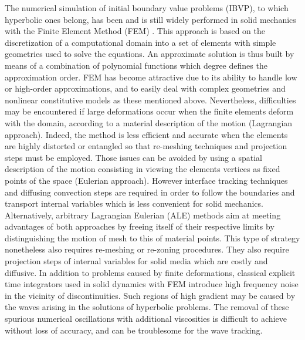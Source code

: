 The numerical simulation of initial boundary value problems (IBVP), to which hyperbolic ones belong, has been and is still widely performed in solid mechanics with the Finite Element Method (FEM) \cite{Belytschko}.
This approach is based on the discretization of a computational domain into a set of elements with simple geometries used to solve the equations.
An approximate solution is thus built by means of a combination of polynomial functions which degree defines the approximation order.
FEM has become attractive due to its ability to handle low or high-order approximations, and to easily deal with complex geometries and nonlinear constitutive models as these mentioned above.  %
Nevertheless, difficulties may be encountered if large deformations occur when the finite elements deform with the domain, according to a material description of the motion (Lagrangian approach).
Indeed, the method is less efficient and accurate when the elements are highly distorted or entangled so that re-meshing techniques and projection steps must be employed.
Those issues can be avoided by using a spatial description of the motion consisting in viewing the elements vertices as fixed points of the space (Eulerian approach).
However interface tracking techniques and diffusing convection steps are required in order to follow the boundaries and transport internal variables which is less convenient for solid mechanics.
Alternatively, arbitrary Lagrangian Eulerian (ALE) methods aim at meeting advantages of both approaches by freeing itself of their respective limits by distinguishing the motion of mesh to this of material points.
This type of strategy nonetheless also requires re-meshing or re-zoning procedures. %
They also require projection steps of internal variables for solid media which are costly and diffusive.
In addition to problems caused by finite deformations, classical explicit time integrators used in solid dynamics with FEM introduce high frequency noise in the vicinity of discontinuities.
Such regions of high gradient may be caused by the waves arising in the solutions of hyperbolic problems.
The removal of these spurious numerical oscillations with additional viscosities is difficult to achieve without loss of accuracy, and can be troublesome for the wave tracking.

